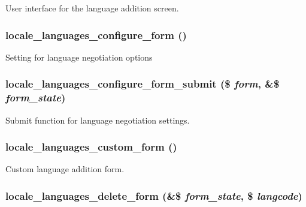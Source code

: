 User interface for the language addition screen. \hypertarget{group__locale_gd4a0fb5717a5318793af57ec86169949}{
\subsubsection[{locale\_\-languages\_\-configure\_\-form}]{\setlength{\rightskip}{0pt plus 5cm}locale\_\-languages\_\-configure\_\-form ()}}
\label{group__locale_gd4a0fb5717a5318793af57ec86169949}


Setting for language negotiation options \hypertarget{group__locale_gd11520d8b7d086b4b801b4a51068ed11}{
\subsubsection[{locale\_\-languages\_\-configure\_\-form\_\-submit}]{\setlength{\rightskip}{0pt plus 5cm}locale\_\-languages\_\-configure\_\-form\_\-submit (\$ {\em form}, \/  \&\$ {\em form\_\-state})}}
\label{group__locale_gd11520d8b7d086b4b801b4a51068ed11}


Submit function for language negotiation settings. \hypertarget{group__locale_g37f39352a275f470e0acce3157108b76}{
\subsubsection[{locale\_\-languages\_\-custom\_\-form}]{\setlength{\rightskip}{0pt plus 5cm}locale\_\-languages\_\-custom\_\-form ()}}
\label{group__locale_g37f39352a275f470e0acce3157108b76}


Custom language addition form. \hypertarget{group__locale_ga207017c2a9b12c01b98bb40193d6acd}{
\subsubsection[{locale\_\-languages\_\-delete\_\-form}]{\setlength{\rightskip}{0pt plus 5cm}locale\_\-languages\_\-delete\_\-form (\&\$ {\em form\_\-state}, \/  \$ {\em langcode})}}
\label{group__locale_ga207017c2a9b12c01b98bb40193d6acd}


